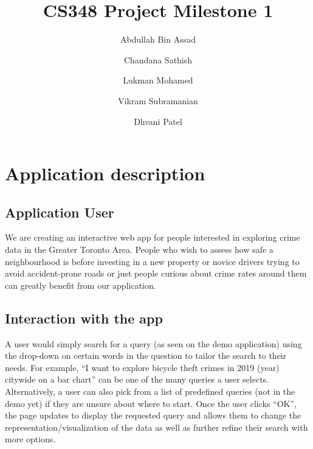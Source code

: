\documentclass[12pt, a4paper]{article}
\title{CS348 Project Milestone 1}
\author{Abdullah Bin Assad\and Chandana Sathish \and Lukman Mohamed \and Vikram Subramanian \and Dhvani Patel}
\begin{document}
\maketitle

\section*{Application description}
\subsection*{Application User}
We are creating an interactive web app for people interested in exploring crime data in the Greater Toronto Area. People who wish to assess how safe a neighbourhood is before investing in a new property or novice drivers trying to avoid accident-prone roads or just people curious about crime rates around them can greatly benefit from our application.
\subsection*{Interaction with the app}
A user would simply search for a query (as seen on the demo application) using the drop-down on certain words in the question to tailor the search to their needs. For example, “I want to explore bicycle theft crimes in 2019 (year) citywide on a bar chart” can be one of the many queries a user selects. Alternatively, a user can also pick from a list of predefined queries (not in the demo yet) if they are unsure about where to start. Once the user clicks “OK”, the page updates to display the requested query and allows them to change the representation/visualization of the data as well as further refine their search with more options.
\end{document}
